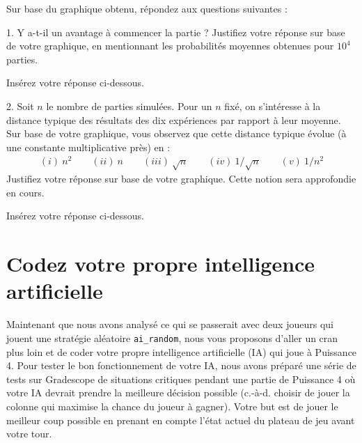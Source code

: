 \documentclass[11pt,answers]{exam}
\begin{document}
Sur base du graphique obtenu, répondez aux questions suivantes :

\medskip

1. Y a-t-il un avantage à commencer la partie ? Justifiez votre réponse sur base de votre graphique, en mentionnant les probabilités moyennes obtenues pour $10^4$ parties.
    
\begin{solutionbox}{25mm}
Insérez votre réponse ci-dessous.


\end{solutionbox}

\medskip

2. Soit $n$ le nombre de parties simulées. Pour un $n$ fixé, on s'intéresse à la distance typique des résultats des dix expériences par rapport à leur moyenne. Sur base de votre graphique, vous observez que cette distance typique évolue (à une constante multiplicative près) en :
\begin{align*}
      (i) \ n^2 \qquad  (ii) \ n \qquad  (iii)\  \sqrt{n} \qquad (iv) \ 1/\sqrt{n} \qquad  (v) \  1/n^2
\end{align*}
Justifiez votre réponse sur base de votre graphique. Cette notion sera approfondie en cours.

\begin{solutionbox}{25mm}
Insérez votre réponse ci-dessous.


\end{solutionbox}

\newpage

\section{Codez votre propre intelligence artificielle}

Maintenant que nous avons analysé ce qui se passerait avec deux joueurs qui jouent une stratégie aléatoire \texttt{ai\_random}, nous vous proposons d’aller un cran plus loin et de coder votre propre intelligence artificielle (IA) qui joue à Puissance 4. 
Pour tester le bon fonctionnement de votre IA, nous avons préparé une série de tests sur Gradescope de situations critiques pendant une partie de Puissance 4 où votre IA devrait prendre la meilleure décision possible (c.-à-d. choisir de jouer la colonne qui maximise la chance du joueur à gagner). Votre but est de jouer le meilleur coup possible en prenant en compte l'état actuel du plateau de jeu avant votre tour.

\medskip
\end{document}
